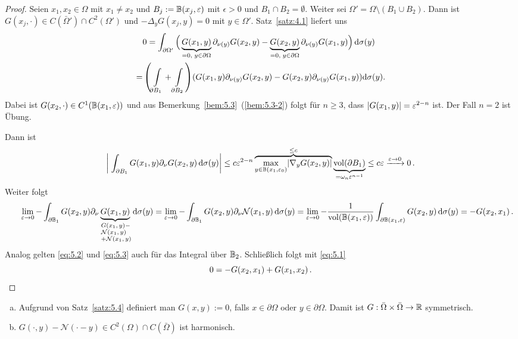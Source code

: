\begin{proof}
  Seien $x_1,x_2\in\Omega$ mit $x_1\neq x_2$ und $B_j:=\mathbb{B}(x_j,\varepsilon)$ mit $\epsilon>0$ und $B_1\cap B_2=\emptyset$. Weiter sei $\Omega'=\Omega\setminus(B_1\cup B_2)$. Dann ist $G(x_j,\cdot)\in C(\bar\Omega')\cap C^2(\Omega')$ und $-\Delta_yG(x_j,y)=0$ mit $y\in\Omega'$. Satz~\ref{satz:4.1} liefert uns 
  \begin{align}
    \label{eq:5.1}
    \begin{aligned}
    &0=\int_{\partial\Omega'}\Big(
      \underbrace{G(x_1,y)}_{=0,\;y\in\partial\Omega}\partial_{\nu(y)}G(x_2,y)
      -\underbrace{G(x_2,y)}_{=0,\;y\in\partial\Omega}\partial_{\nu(y)}G(x_1,y)
    \Big)\,\mathrm{d}\sigma(y) \\
    =&\left(
      \int\limits_{\partial B_1}+\int\limits_{\partial B_2}
    \right) \!
    (
      G(x_1,y)\partial_{\nu(y)}G(x_2,y)-G(x_2,y)\partial_{\nu(y)}G(x_1,y)
   )\!\,\mathrm{d}\sigma(y).
    \end{aligned}
  \end{align}
Dabei ist $G(x_2,\cdot)\in C^1(\mathbb{B}(x_1,\varepsilon))$ und aus Bemerkung~\ref{bem:5.3}~(\ref{bem:5.3-2}) folgt für $n\geq3$, dass $\lvert G(x_1,y)\rvert=\varepsilon^{2-n}$ ist. Der Fall $n=2$ ist Übung.

Dann ist
\begin{dmath}
  \label{eq:5.2}
  \Abs{\; 
    \int_{\partial B_1}G(x_1,y)\partial_\nu G(x_2,y)\d\sigma(y)
  }\leq
  c\epsilon^{2-n}\overbrace{\max_{y\in\B(x_1,\epsilon_0)}\abs{\nabla_yG(x_2,y)}}^{\leq
    c} \underbrace{\vol(\partial B_1)}_{=\omega_n\epsilon^{n-1}}
  \leq c\epsilon\xrightarrow{\epsilon\ra0}0 \, .
\end{dmath}
Weiter folgt
\begin{dmath}
  \label{eq:5.3}
 \ \ \quad \lim_{\epsilon\ra0}-\int_{\partial\B_1}G(x_2,y)\partial_\nu\underbrace{G(x_1,y)}_{\parbox{1.2cm}{\scriptsize$
    G(x_1,y)-\mathcal{N}(x_1,y)$ \\$+\mathcal{N}(x_1,y)
 $}} \d\sigma(y)
  =\lim_{\epsilon\ra0}-\int_{\partial\B_1}G(x_2,y)\partial_\nu\mathcal{N}(x_1,y)\d\sigma(y)
  =\lim_{\epsilon\ra0}-\frac{1}{\vol(\B(x_1,\epsilon))}\int_{\partial\B(x_1,\epsilon)}G(x_2,y)\d\sigma(y)
  =-G(x_2,x_1)\, .
\end{dmath}
Analog gelten \eqref{eq:5.2} und \eqref{eq:5.3} auch für das Integral über $\mathbb{B}_2$. Schließlich folgt mit \eqref{eq:5.1}
\[
0=-G(x_2,x_1)+G(x_1,x_2) \, .\qedhere
\]
\end{proof}

\begin{bem}
  \label{bem:5.5}
  \begin{enumerate}[(a)]
  \item Aufgrund von Satz~\ref{satz:5.4} definiert man $G(x,y):=0$, falls $x\in\partial\Omega$ oder $y\in\partial\Omega$. Damit ist $G:\bar\Omega\times\bar\Omega\rightarrow\mathbb{R}$ symmetrisch.
  \item $G(\cdot,y)-\mathcal{N}(\cdot-y)\in C^2(\Omega)\cap C(\bar\Omega)$ ist harmonisch.
  \end{enumerate}
\end{bem}

